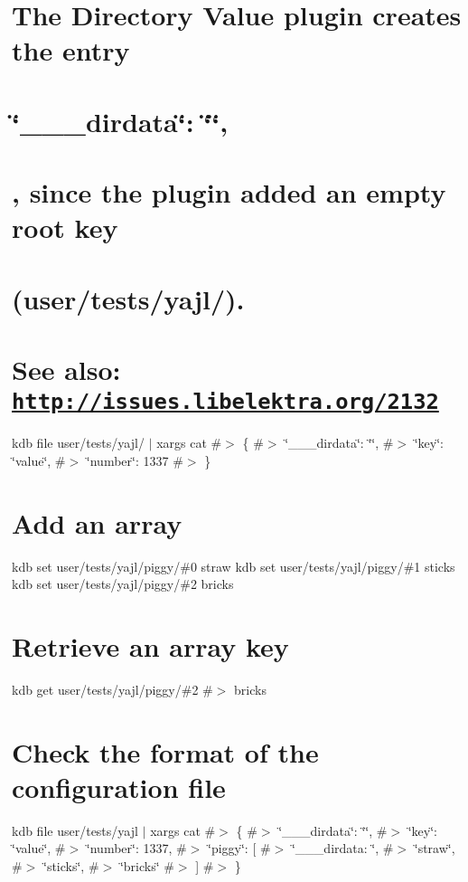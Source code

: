\section*{The Directory Value plugin creates the entry}

\section*{\char`\"{}\+\_\+\+\_\+\+\_\+dirdata\char`\"{}\+: \char`\"{}\char`\"{},}

\section*{, since the plugin added an empty root key}

\section*{({\ttfamily user/tests/yajl/}).}

\section*{See also\+: \href{http://issues.libelektra.org/2132}{\tt http\+://issues.\+libelektra.\+org/2132}}

kdb file user/tests/yajl/ $\vert$ xargs cat \#$>$ \{ \#$>$ \char`\"{}\+\_\+\+\_\+\+\_\+dirdata\char`\"{}\+: \char`\"{}\char`\"{}, \#$>$ \char`\"{}key\char`\"{}\+: \char`\"{}value\char`\"{}, \#$>$ \char`\"{}number\char`\"{}\+: 1337 \#$>$ \}

\section*{Add an array}

kdb set user/tests/yajl/piggy/\#0 straw kdb set user/tests/yajl/piggy/\#1 sticks kdb set user/tests/yajl/piggy/\#2 bricks

\section*{Retrieve an array key}

kdb get user/tests/yajl/piggy/\#2 \#$>$ bricks

\section*{Check the format of the configuration file}

kdb file user/tests/yajl $\vert$ xargs cat \#$>$ \{ \#$>$ \char`\"{}\+\_\+\+\_\+\+\_\+dirdata\char`\"{}\+: \char`\"{}\char`\"{}, \#$>$ \char`\"{}key\char`\"{}\+: \char`\"{}value\char`\"{}, \#$>$ \char`\"{}number\char`\"{}\+: 1337, \#$>$ \char`\"{}piggy\char`\"{}\+: \mbox{[} \#$>$ \char`\"{}\+\_\+\+\_\+\+\_\+dirdata\+: \char`\"{}, \#$>$ \char`\"{}straw\char`\"{}, \#$>$ \char`\"{}sticks\char`\"{}, \#$>$ \char`\"{}bricks\char`\"{} \#$>$ \mbox{]} \#$>$ \}

